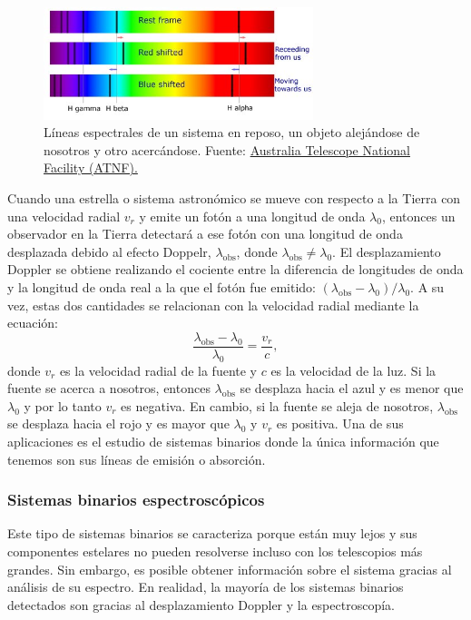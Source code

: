 \begin{figure}[htb]
  \centering
				\includegraphics[width=0.7\textwidth]{figures/doppler-shift.jpg}
				\caption{Líneas espectrales de un sistema en reposo, un objeto alejándose de nosotros y otro acercándose. Fuente: \href{https://www.atnf.csiro.au/outreach//education/senior/astrophysics/spectra_info.html}{Australia Telescope National Facility (ATNF).}}
				\label{fig:doppler-shift} 
\end{figure}

Cuando una estrella o sistema astronómico se mueve con respecto a la Tierra con una velocidad radial $ v_r $ y emite un fotón a una longitud de onda $ \lambda_0 $, entonces un observador en la Tierra detectará a ese fotón con una longitud de onda desplazada debido al efecto Doppelr, $ \lambda_{\mathrm{obs}} $, donde $ \lambda_{\mathrm{obs}} \neq \lambda_0 $. El desplazamiento Doppler se obtiene realizando el cociente entre la diferencia de longitudes de onda y la longitud de onda real a la que el fotón fue emitido: $ (\lambda_{\mathrm{obs}} - \lambda_0)/\lambda_0 $. A su vez, estas dos cantidades se relacionan con la velocidad radial mediante la ecuación:
\[ \frac{\lambda_{\mathrm{obs}} - \lambda_0}{\lambda_0} = \frac{v_r}{c}, \]
donde $ v_r $ es la velocidad radial de la fuente y $ c $ es la velocidad de la luz. Si la fuente se acerca a nosotros, entonces $\lambda_{\mathrm{obs}}$ se desplaza hacia el azul y es menor que $\lambda_0$ y por lo tanto $v_r$ es negativa. En cambio, si la fuente se aleja de nosotros, $\lambda_{\mathrm{obs}}$ se desplaza hacia el rojo y es mayor que $\lambda_0$ y $v_r$ es positiva. Una de sus aplicaciones es el estudio de sistemas binarios donde la única información que tenemos son sus líneas de emisión o absorción. 

\subsubsection{Sistemas binarios espectroscópicos}
Este tipo de sistemas binarios se caracteriza porque están muy lejos y sus componentes estelares no pueden resolverse incluso con los telescopios más grandes. Sin embargo, es posible obtener información sobre el sistema gracias al análisis de su espectro. En realidad, la mayoría de los sistemas binarios detectados son gracias al desplazamiento Doppler y la espectroscopía.

